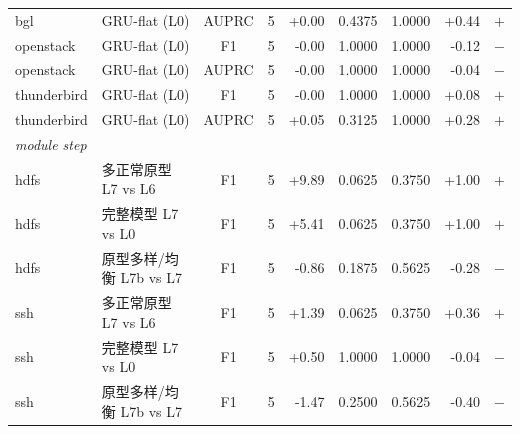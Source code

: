 \documentclass[11pt,a4paper]{article}
\begin{document}
\begin{table}[H]
{{\begin{tabular}{llccrrrrl}
bgl & GRU-flat (L0) & AUPRC & 5 & +0.00 & 0.4375 & 1.0000 & +0.44 & $+$ \\
openstack & GRU-flat (L0) & F1 & 5 & -0.00 & 1.0000 & 1.0000 & -0.12 & $-$ \\
openstack & GRU-flat (L0) & AUPRC & 5 & -0.00 & 1.0000 & 1.0000 & -0.04 & $-$ \\
thunderbird & GRU-flat (L0) & F1 & 5 & -0.00 & 1.0000 & 1.0000 & +0.08 & $+$ \\
thunderbird & GRU-flat (L0) & AUPRC & 5 & +0.05 & 0.3125 & 1.0000 & +0.28 & $+$ \\
\multicolumn{4}{l}{\textit{module step}} &  &  &  &  &  \\
hdfs & 多正常原型 L7 vs L6 & F1 & 5 & +9.89 & 0.0625 & 0.3750 & +1.00 & $+$ \\
hdfs & 完整模型 L7 vs L0 & F1 & 5 & +5.41 & 0.0625 & 0.3750 & +1.00 & $+$ \\
hdfs & 原型多样/均衡 L7b vs L7 & F1 & 5 & -0.86 & 0.1875 & 0.5625 & -0.28 & $-$ \\
ssh & 多正常原型 L7 vs L6 & F1 & 5 & +1.39 & 0.0625 & 0.3750 & +0.36 & $+$ \\
ssh & 完整模型 L7 vs L0 & F1 & 5 & +0.50 & 1.0000 & 1.0000 & -0.04 & $-$ \\
ssh & 原型多样/均衡 L7b vs L7 & F1 & 5 & -1.47 & 0.2500 & 0.5625 & -0.40 & $-$ \\
\bottomrule
\end{tabular}
}
}
\end{table}
\end{document}
